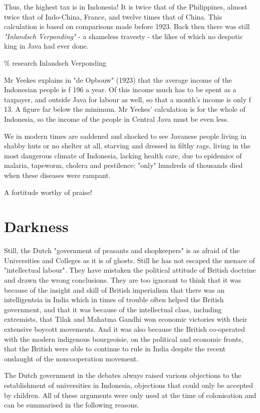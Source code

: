 Thus, the highest tax is in Indonesia! It is twice that of the Philippines, 
almost twice that of Indo-China, France, and twelve times that of China. 
This calculation is based on comparisons made before 1923. Back then there was still 
\emph{"Inlandsch Verponding"} - a shameless travesty - the likes of which no despotic king in Java had ever done.\nline

\% research Inlandsch Verponding

Mr Yeekes explains in "de Opbouw" (1923) that the average income 
of the Indonesian people is f 196 a year. Of this income much has 
to be spent as a taxpayer, and outside Java for labour as well, 
so that a month's income is only f 13. A figure far below the minimum. 
Mr Yeekes' calculation is for the whole of Indonesia, so the income of 
the people in Central Java must be even less.\nline

We in modern times are saddened and shocked to see Javanese people 
living in shabby huts or no shelter at all, starving and dressed in 
filthy rags, living in the most dangerous climate of Indonesia, lacking 
health care, due to epidemics of malaria, tapeworm, cholera and pestilence; 
"only" hundreds of thousands died when these diseases were rampant.\nline

A fortitude worthy of praise!

\section{Darkness}

Still, the Dutch "government of peasants and shopkeepers" is as afraid of the 
Universities and Colleges as it is of ghosts. Still he has not escaped the menace 
of "intellectual labour". They have mistaken the political attitude of British doctrine 
and drawn the wrong conclusions. They are too ignorant to think that it was 
because of the insight and skill of British imperialism that there was an 
intelligentsia in India which in times of trouble often helped the British 
government, and that it was because of the intellectual class, including extremists, 
that Tilak and Mahatma Gandhi won economic victories with their extensive boycott movements. 
And it was also because the British co-operated with the modern indigenous bourgeoisie, on 
the political and economic fronts, that the British were able to continue to rule in India 
despite the recent onslaught of the noncooperation movement.\nline

The Dutch government in the debates always raised various objections to the establishment 
of universities in Indonesia, objections that could only be accepted by children. All of 
these arguments were only used at the time of colonisation and can be summarised in the following reasons.\nline

